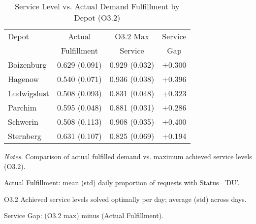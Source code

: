 \begin{table}[ht]
\centering
\caption{Service Level vs. Actual Demand Fulfillment by Depot (O3.2)}
\label{tab:service_vs_fulfillment}
\begin{threeparttable}
\begin{tabular}{lccc}
\toprule
Depot & Actual & O3.2 Max & Service \\
& Fulfillment & Service & Gap \\
\midrule
Boizenburg & 0.629 (0.091) & 0.929 (0.032) & +0.300 \\
Hagenow & 0.540 (0.071) & 0.936 (0.038) & +0.396 \\
Ludwigslust & 0.508 (0.093) & 0.831 (0.048) & +0.323 \\
Parchim & 0.595 (0.048) & 0.881 (0.031) & +0.286 \\
Schwerin & 0.508 (0.113) & 0.908 (0.035) & +0.400 \\
Sternberg & 0.631 (0.107) & 0.825 (0.069) & +0.194 \\
\bottomrule
\end{tabular}
\begin{tablenotes}
\smaller
\item \textit{Notes.} Comparison of actual fulfilled demand vs. maximum achieved service levels (O3.2).
\item Actual Fulfillment: mean (std) daily proportion of requests with Status='DU'.
\item O3.2 Achieved service levels solved optimally per day; average (std) across days.
\item Service Gap: (O3.2 max) minus (Actual Fulfillment).
\end{tablenotes}
\end{threeparttable}
\end{table}

